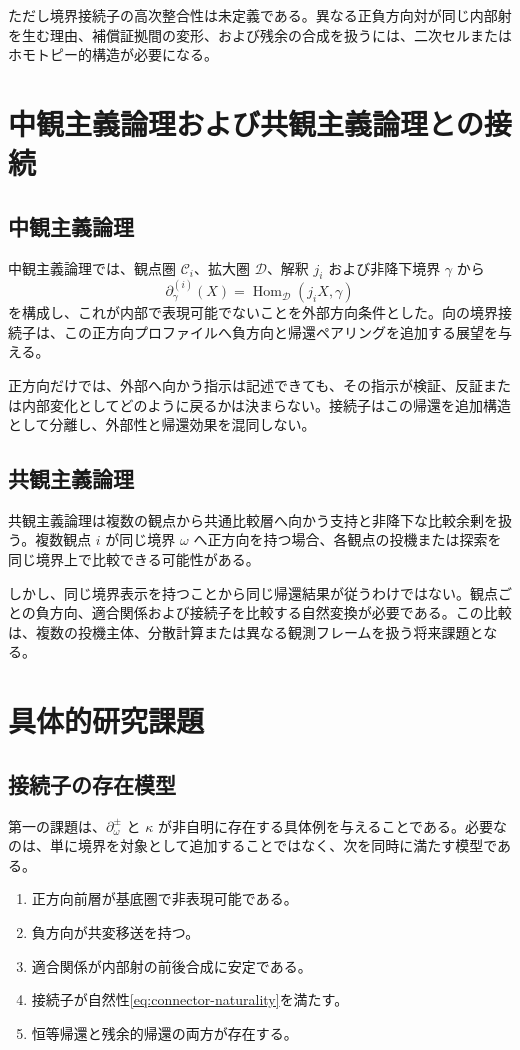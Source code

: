 \documentclass[a4paper,11pt]{ltjsarticle}
\theoremstyle{definition}
\theoremstyle{plain}
\newcommand{\Hom}{\operatorname{Hom}}
\begin{document}
ただし境界接続子の高次整合性は未定義である。異なる正負方向対が同じ内部射を生む理由、補償証拠間の変形、および残余の合成を扱うには、二次セルまたはホモトピー的構造が必要になる。

\section{中観主義論理および共観主義論理との接続}

\subsection{中観主義論理}

中観主義論理では、観点圏 $\mathcal C_i$、拡大圏 $\mathcal D$、解釈 $j_i$ および非降下境界 $\gamma$ から
\[
 \partial_\gamma^{(i)}(X)
 =\Hom_{\mathcal D}(j_iX,\gamma)
\]
を構成し、これが内部で表現可能でないことを外部方向条件とした\cite{ChibaMadhyic2026}。向の境界接続子は、この正方向プロファイルへ負方向と帰還ペアリングを追加する展望を与える。

正方向だけでは、外部へ向かう指示は記述できても、その指示が検証、反証または内部変化としてどのように戻るかは決まらない。接続子はこの帰還を追加構造として分離し、外部性と帰還効果を混同しない。

\subsection{共観主義論理}

共観主義論理は複数の観点から共通比較層へ向かう支持と非降下な比較余剰を扱う\cite{ChibaCotuition2026}。複数観点 $i$ が同じ境界 $\omega$ へ正方向を持つ場合、各観点の投機または探索を同じ境界上で比較できる可能性がある。

しかし、同じ境界表示を持つことから同じ帰還結果が従うわけではない。観点ごとの負方向、適合関係および接続子を比較する自然変換が必要である。この比較は、複数の投機主体、分散計算または異なる観測フレームを扱う将来課題となる。

\section{具体的研究課題}

\subsection{接続子の存在模型}

第一の課題は、$\partial_\omega^\pm$ と $\kappa$ が非自明に存在する具体例を与えることである。必要なのは、単に境界を対象として追加することではなく、次を同時に満たす模型である。
\begin{enumerate}
 \item 正方向前層が基底圏で非表現可能である。
 \item 負方向が共変移送を持つ。
 \item 適合関係が内部射の前後合成に安定である。
 \item 接続子が自然性\eqref{eq:connector-naturality}を満たす。
 \item 恒等帰還と残余的帰還の両方が存在する。
\end{enumerate}
\end{document}
